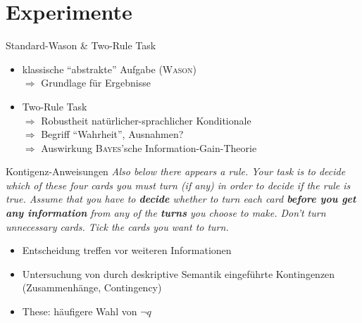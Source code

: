 
\section{Experimente}

\begin{frame}{Standard-Wason \& Two-Rule Task {\scriptsize \cite[S.~95-96]{stenningHumanReasoningCognitive2008}}}
    \begin{itemize}
        \item klassische \enquote{abstrakte} Aufgabe (\textsc{Wason}) \\
            $\Rightarrow$ Grundlage für Ergebnisse
        \pause

        \item Two-Rule Task \\
            $\Rightarrow$ Robustheit natürlicher-sprachlicher Konditionale \\
            $\Rightarrow$ Begriff \enquote{Wahrheit}, Ausnahmen? \\
            \pause
            $\Rightarrow$ Auswirkung \textsc{Bayes}'sche Information-Gain-Theorie
    \end{itemize}
\end{frame}


\begin{frame}{Kontigenz-Anweisungen {\scriptsize \cite[S.~96-97]{stenningHumanReasoningCognitive2008}}}
    \emph{
        {\small Also below there appears a rule.
        Your task is to decide which of these four cards you must turn (if any) in order to decide if the rule is true.}
        \alert{Assume that you have to \textbf{decide} whether to turn each card \textbf{before you get any information} from any of the \textbf{turns} you choose to make.}
        {\small Don't turn unnecessary cards. Tick the cards you want to turn.}
    }

    \begin{itemize}
        \item Entscheidung treffen vor weiteren Informationen
        \item Untersuchung von durch deskriptive Semantik eingeführte Kontingenzen {\footnotesize (Zusammenhänge, Contingency)}
        \item These: häufigere Wahl von $\lnot q$
    \end{itemize}
\end{frame}


